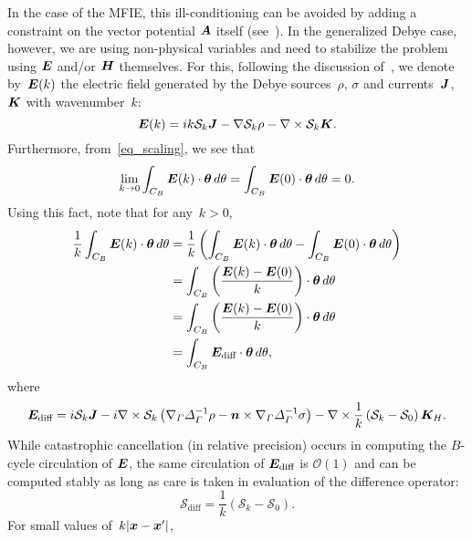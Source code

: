 \documentclass[11pt]{article}
\newcommand{\vct}{\vectorsym}
\newcommand{\surfgrad}{\nabla_\Gamma}
\newcommand{\surflap}{\Delta_\Gamma}
\newcommand{\bx}{\vct{ x}}
\newcommand{\bE}{\vectorsym{E}}
\newcommand{\bH}{\vct{ H}}
\newcommand{\bJ}{\vct{ J}}
\newcommand{\bK}{\vct{ K}}
\newcommand{\cS}{\mathcal S}
\newcommand\thetahat{{\vct{{\theta}}}}
\newcommand\nhat{\vct{ {n}}}
\newcommand\cO{\mathcal O}
\newcommand\bA{\vct{A}}
\numberwithin{equation}{section}
\begin{document}
In the case of the MFIE, this ill-conditioning can be avoided by 
adding a constraint on the
vector potential $\bA$ itself (see~\cite{epstein-2013}).
In the generalized Debye case, however, we are using non-physical variables
and need to stabilize the problem using $\bE$ and/or $\bH$ themselves.
For this, following the discussion of~\cite{epstein-2013}, we denote by~$\bE(k)$ the
electric field generated by the Debye sources~$\rho$, $\sigma$ and
currents~$\bJ$, $\bK$ with wavenumber~$k$:
\begin{equation}
  \bE(k) = ik \cS_k\bJ - \nabla  \cS_k \rho - \nabla \times
  \cS_k\bK.
\end{equation}
Furthermore, from~\eqref{eq_scaling}, we see that
\begin{equation}
  \lim_{k \to 0} \int_{C_B} \bE(k) \cdot \thetahat \, d\theta =
   \int_{C_B} \bE(0) \cdot \thetahat \, d\theta = 0.
\end{equation}
Using this fact, note that
for any~$k>0$,
\begin{equation}
  \begin{aligned}
    \frac{1}{k} \int_{C_B} \bE(k) \cdot \thetahat \, d\theta &=
    \frac{1}{k} \left( \int_{C_B} \bE(k) \cdot \thetahat \, d\theta  -
      \int_{C_B} \bE(0) \cdot \thetahat \, d\theta \right) \\
    &=
     \int_{C_B} \left(\frac{ \bE(k)-\bE(0)}{k} \right) \cdot \thetahat
     \, d\theta \\
     &=
     \int_{C_B} \left(\frac{ \bE(k)-\bE(0)}{k} \right) \cdot \thetahat
     \, d\theta \\
     &=
     \int_{C_B} \bE_{\text{diff}} \cdot \thetahat \, d\theta,
  \end{aligned}
\end{equation}
where
\begin{equation}
  \bE_{\text{diff}} = i\cS_k\bJ - i \nabla \times \cS_k  \left( \surfgrad
    \surflap^{-1} \rho - \nhat \times \surfgrad \surflap^{-1} \sigma
  \right)
  - \nabla \times \frac{1}{k} \left( \cS_k - \cS_0 \right)\bK_H.
\end{equation}
While catastrophic cancellation (in relative precision)
occurs in computing the $B$-cycle circulation of $\bE$, the same
circulation of $\bE_{\text{diff}}$ is $\cO(1)$ and can be computed
stably as long as care is taken in evaluation of the difference operator:
\begin{equation}
  \cS_{\text{diff}} = \frac{1}{k} \left( \cS_k - \cS_0 \right).
\end{equation}
For small values of~$k|\bx-\bx'|$,
\end{document}
